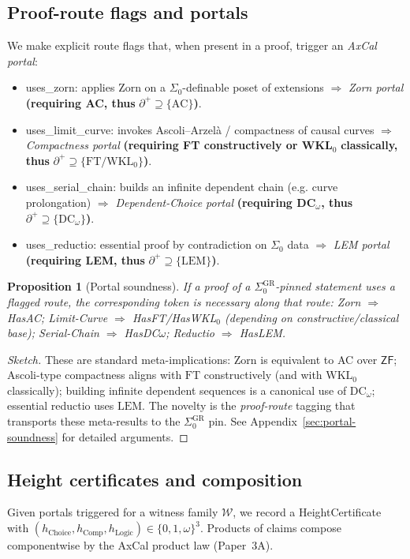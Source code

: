 \documentclass[11pt]{article}
\newtheorem{proposition}[theorem]{Proposition}
\theoremstyle{definition}
\theoremstyle{remark}
\newcommand{\ZF}{\mathsf{ZF}}
\newcommand{\LEM}{\mathrm{LEM}}
\newcommand{\FT}{\mathrm{FT}}
\newcommand{\WKLz}{\mathrm{WKL}_0}
\newcommand{\AC}{\mathrm{AC}}
\newcommand{\DCw}{\mathrm{DC}_\omega}
\newcommand{\SigmaZero}{\Sigma_{0}}
\newcommand{\Frontierpos}{\partial^{+}}
\newcommand{\hChoice}{h_{\mathrm{Choice}}}    %
\newcommand{\hComp}{h_{\mathrm{Comp}}}        %
\newcommand{\hLogic}{h_{\mathrm{Logic}}}      %
\begin{document}
\subsection{Proof-route flags and portals}
We make explicit route flags that, when present in a proof, trigger an \emph{AxCal portal}:
\begin{itemize}
\item \textsf{uses\_zorn}: applies Zorn on a $\SigmaZero$-definable poset of extensions $\Rightarrow$ \emph{Zorn portal} \textbf{(requiring AC, thus} $\Frontierpos\supseteq\{\AC\}$\textbf{)}.
\item \textsf{uses\_limit\_curve}: invokes Ascoli--Arzelà / compactness of causal curves $\Rightarrow$ \emph{Compactness portal} \textbf{(requiring FT constructively or WKL}$_0$ \textbf{classically, thus} $\Frontierpos\supseteq\{\FT/\WKLz\}$\textbf{)}.
\item \textsf{uses\_serial\_chain}: builds an infinite dependent chain (e.g. curve prolongation) $\Rightarrow$ \emph{Dependent-Choice portal} \textbf{(requiring DC}$_\omega$\textbf{, thus} $\Frontierpos\supseteq\{\DCw\}$\textbf{)}.
\item \textsf{uses\_reductio}: essential proof by contradiction on $\SigmaZero$ data $\Rightarrow$ \emph{LEM portal} \textbf{(requiring LEM, thus} $\Frontierpos\supseteq\{\LEM\}$\textbf{)}.
\end{itemize}

\begin{proposition}[Portal soundness]\label{prop:portals}
If a proof of a $\SigmaZero^{\mathrm{GR}}$-pinned statement uses a flagged route, the corresponding token is necessary along that route: Zorn $\Rightarrow$ HasAC; Limit-Curve $\Rightarrow$ HasFT/HasWKL$_0$ (depending on constructive/classical base); Serial-Chain $\Rightarrow$ HasDC$\omega$; Reductio $\Rightarrow$ HasLEM.
\end{proposition}

\begin{proof}[Sketch]
These are standard meta-implications: Zorn is equivalent to AC over $\ZF$; Ascoli-type compactness aligns with $\FT$ constructively (and with $\WKLz$ classically); building infinite dependent sequences is a canonical use of $\DCw$; essential reductio uses $\LEM$. The novelty is the \emph{proof-route} tagging that transports these meta-results to the $\SigmaZero^{\mathrm{GR}}$ pin. See Appendix~\ref{sec:portal-soundness} for detailed arguments.
\end{proof}

\subsection{Height certificates and composition}
Given portals triggered for a witness family $\mathcal{W}$, we record a HeightCertificate with $(\hChoice,\hComp,\hLogic)\in\{0,1,\omega\}^3$. Products of claims compose componentwise by the AxCal product law (Paper~3A).
\end{document}
